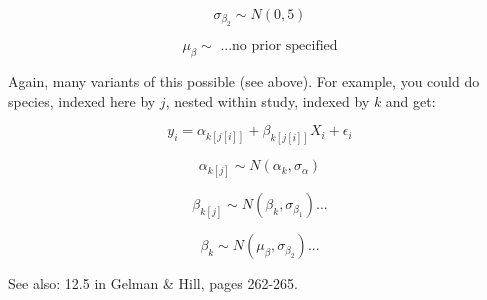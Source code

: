 \documentclass[12pt,a4paper]{article}
\begin{document}
\begin{equation}
\sigma_{\beta_{2}}\sim N(0,5)
\end{equation}

\begin{equation}
\mu_{\beta}\sim \text{ ...no prior specified}
\end{equation}

\vspace{2ex}
\noindent Again, many variants of this possible (see above). For example, you could do species, indexed here by $j$, nested within study, indexed by $k$ and get:

\begin{equation}
y_{i}=\alpha_{k[j[i]]}+\beta_{k[j[i]]}X_{i}+\epsilon_{i}
\end{equation}

\begin{equation}
\alpha_{k[j]} \sim N(\alpha_{k}, \sigma_{\alpha})
\end{equation}


\begin{equation}
\beta_{k[j]} \sim N(\beta_{k}, \sigma_{\beta_{1}})...
\end{equation}

\begin{equation}
\beta_{k} \sim N(\mu_{\beta}, \sigma_{\beta_{2}})...
\end{equation}

\vspace{2ex}

\noindent See also: 12.5 in Gelman \& Hill, pages 262-265.
\end{document}
